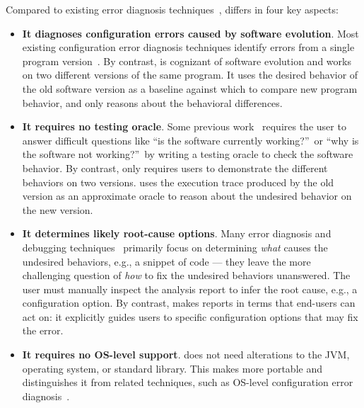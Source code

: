 Compared to existing error diagnosis
techniques~\cite{Wang:2004:AMT, Rabkin:2011:PPC, Whitaker:2004:CDS,
Zhang:2013:ADS, Attariyan:2010:ACT, Su:2007:AIC, Attariyan:2008:UCD, xray
}, \ourtool differs in four
key aspects:


\begin{itemize}
\item \textbf{It diagnoses configuration errors caused by software evolution}.
Most existing configuration error diagnosis techniques
identify errors from a single program
version~\cite{Wang:2004:AMT, Rabkin:2011:PPC, Whitaker:2004:CDS,
Zhang:2013:ADS, Attariyan:2010:ACT, Su:2007:AIC, Attariyan:2008:UCD, xray}.
By contrast, \ourtool is cognizant of software evolution and
works on two different versions of the same program. 
It uses the desired behavior of the old software version
as a baseline against which to compare new program behavior, and only
reasons about the behavioral differences.

\item \textbf{It requires no testing oracle}.
Some previous work~\cite{Rabkin:2011:PPC, Whitaker:2004:CDS,
Attariyan:2010:ACT, Su:2007:AIC} requires the user to answer difficult
questions like ``is the software currently working?''\ or ``why is the
software not working?''\ by writing a testing
oracle to check the software behavior. By contrast,
\ourtool only requires users to
demonstrate the different behaviors on two versions.
\ourtool uses the execution trace produced by the old
version as an approximate oracle to
reason about the undesired behavior on the new version.

\item \textbf{It determines likely root-cause options}.
Many error diagnosis and debugging techniques~\cite{dd, autoflow}
primarily focus on
determining \textit{what} causes the undesired behaviors, e.g.,
a snippet of code --- they leave the more challenging
question of \textit{how} to fix the undesired behaviors
unanswered.  The user must manually inspect the analysis
report to infer
the root cause, e.g., a configuration option.
By contrast, \ourtool makes reports in terms that 
end-users can act on:  it explicitly guides users to specific
configuration options that may fix the error.

\item \textbf{It requires no OS-level support}. \ourtool
does not need alterations to the JVM, operating system, or
standard library. This makes \ourtool more portable and
distinguishes it from related techniques, such as
OS-level configuration error diagnosis~\cite{Whitaker:2004:CDS, Su:2007:AIC}.

\end{itemize}

